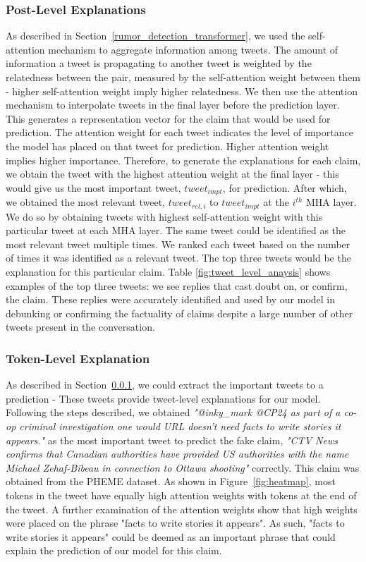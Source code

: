 \documentclass[letterpaper]{article} %
\begin{document}
\subsubsection{Post-Level Explanations}
\label{post_level_explanations}
As described in Section~\ref{rumor_detection_transformer}, we used the self-attention mechanism to aggregate information among tweets. The amount of information a tweet is propagating to another tweet is weighted by the relatedness between the pair, measured by the self-attention weight between them - higher self-attention weight imply higher relatedness. We then use the attention mechanism to interpolate tweets in the final layer before the prediction layer. This generates a representation vector for the claim that would be used for prediction. The attention weight for each tweet indicates the level of importance the model has placed on that tweet for prediction. Higher attention weight implies higher importance.
Therefore, to generate the explanations for each claim, we obtain the tweet with the highest attention weight at the final layer - this would give us the most important tweet, $tweet_{impt}$, for prediction. After which, we obtained the most relevant tweet, $tweet_{rel,i}$ to $tweet_{impt}$ at the $i^{th}$ MHA layer. We do so by obtaining tweets with highest self-attention weight with this particular tweet at each MHA layer. The same tweet could be identified as the most relevant tweet multiple times. We ranked each tweet based on the number of times it was identified as a relevant tweet. The top three tweets would be the explanation for this particular claim. Table \ref{fig:tweet_level_anaysis} shows examples of the top three tweets: we see replies that cast doubt on, or confirm, the claim. These replies were accurately identified and used by our model in debunking or confirming the factuality of claims despite a large number of other tweets present in the conversation.

\subsubsection{Token-Level Explanation}
As described in Section~\ref{post_level_explanations}, we could extract the important tweets to a prediction - These tweets provide tweet-level explanations for our model. Following the steps described, we obtained \textit{"@inky\_mark @CP24 as part of a co-op criminal investigation one would URL doesn't need facts to write stories it appears."} as the most important tweet to predict the fake claim, \textit{"CTV News confirms that Canadian authorities have provided US authorities with the name Michael Zehaf-Bibeau in connection to Ottawa shooting"} correctly. This claim was obtained from the PHEME dataset. As shown in Figure~\ref{fig:heatmap}, most tokens in the tweet have equally high attention weights with tokens at the end of the tweet. A further examination of the attention weights show that high weights were placed on the phrase "facts to write stories it appears". As such, "facts to write stories it appears" could be deemed as an important phrase that could explain the prediction of our model for this claim.
\end{document}
